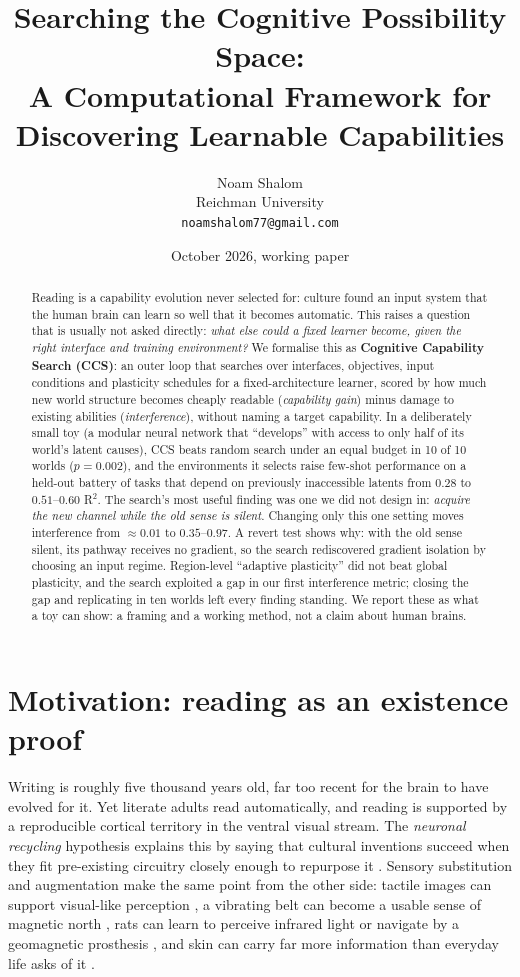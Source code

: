\documentclass[11pt]{article}
\title{\textbf{Searching the Cognitive Possibility Space:}\\
A Computational Framework for Discovering Learnable Capabilities}
\author{Noam Shalom\\
\small Reichman University\\
\small \texttt{noamshalom77@gmail.com}}
\date{October 2026, working paper}
\begin{document}
\maketitle

\begin{abstract}
Reading is a capability evolution never selected for: culture found an input system that the
human brain can learn so well that it becomes automatic. This raises a question that is usually
not asked directly: \emph{what else could a fixed learner become, given the right interface and
training environment?} We formalise this as \textbf{Cognitive Capability Search (CCS)}: an outer
loop that searches over interfaces, objectives, input conditions and plasticity schedules for a
fixed-architecture learner, scored by how much new world structure becomes cheaply readable
(\emph{capability gain}) minus damage to existing abilities (\emph{interference}), without
naming a target capability. In a deliberately small toy (a modular neural network that
``develops'' with access to only half of its world's latent causes), CCS beats random search
under an equal budget in 10 of 10 worlds ($p=0.002$), and the environments it selects raise
few-shot performance on a held-out battery of tasks that depend on previously inaccessible
latents from $0.28$ to $0.51$--$0.60$ R$^2$. The search's most useful finding was one we did not
design in: \emph{acquire the new channel while the old sense is silent}. Changing only this one
setting moves interference from $\approx\!0.01$ to $0.35$--$0.97$. A revert test shows why:
with the old sense silent, its pathway receives no gradient, so the search rediscovered gradient
isolation by choosing an input regime. Region-level ``adaptive plasticity'' did not beat global
plasticity, and the search exploited a gap in our first interference metric; closing the gap and
replicating in ten worlds left every finding standing. We report these as what a toy can show:
a framing and a working method, not a claim about human brains.
\end{abstract}

\section{Motivation: reading as an existence proof}
Writing is roughly five thousand years old, far too recent for the brain to have evolved for it.
Yet literate adults read automatically, and reading is supported by a reproducible cortical
territory in the ventral visual stream. The \emph{neuronal recycling} hypothesis explains this by
saying that cultural inventions succeed when they fit pre-existing circuitry closely enough to
repurpose it \cite{dehaene2007}. Sensory substitution and augmentation make the same point from
the other side: tactile images can support visual-like perception \cite{bachyrita1969}, a
vibrating belt can become a usable sense of magnetic north \cite{nagel2005}, rats can learn to
perceive infrared light \cite{thomson2013} or navigate by a geomagnetic prosthesis
\cite{norimoto2015}, and skin can carry far more information than everyday life asks of it
\cite{novich2015}.
\end{document}
